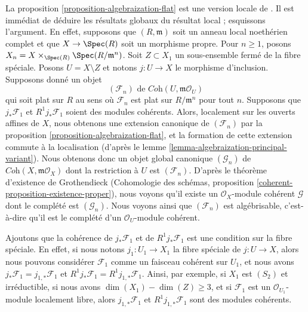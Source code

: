 \begin{remark}
\label{remark-interesting-case-quater}
La proposition \ref{proposition-algebraization-flat} est une version locale
de \cite[théorème 2.10 (i)]{Baranovsky}. Il est immédiat de déduire
les résultats globaux du résultat local ; esquissons l'argument.
En effet, supposons que $(R, \mathfrak m)$
soit un anneau local noethérien complet et que $X \to \Spec(R)$ soit un morphisme propre.
Pour $n \geq 1$, posons $X_n = X \times_{\Spec(R)} \Spec(R/\mathfrak m^n)$.
Soit $Z \subset X_1$ un sous-ensemble fermé de la fibre spéciale.
Posons $U = X \setminus Z$ et notons $j : U \to X$ le morphisme d'inclusion.
Supposons donné un objet
$$
(\mathcal{F}_n) \text{ de } \textit{Coh}(U, \mathfrak m\mathcal{O}_U)
$$
qui soit plat sur $R$ au sens où $\mathcal{F}_n$ est plat sur
$R/\mathfrak m^n$ pour tout $n$.
Supposons que $j_*\mathcal{F}_1$ et $R^1j_*\mathcal{F}_1$ soient des modules
cohérents. Alors, localement sur les ouverts affines de $X$, nous obtenons une extension canonique
de $(\mathcal{F}_n)$ par la
proposition \ref{proposition-algebraization-flat},
et la formation de cette extension commute à la localisation
(d'après le lemme \ref{lemma-algebraization-principal-variant}).
Nous obtenons donc un objet global canonique $(\mathcal{G}_n)$ de
$\textit{Coh}(X, \mathfrak m\mathcal{O}_X)$
dont la restriction à $U$ est $(\mathcal{F}_n)$.
D'après le théorème d'existence de Grothendieck
(Cohomologie des schémas, proposition
\ref{coherent-proposition-existence-proper}),
nous voyons qu'il existe un $\mathcal{O}_X$-module cohérent
$\mathcal{G}$ dont le complété est $(\mathcal{G}_n)$.
Nous voyons ainsi que $(\mathcal{F}_n)$ est algébrisable, c'est-à-dire
qu'il est le complété d'un $\mathcal{O}_U$-module cohérent.

\medskip\noindent
Ajoutons que la cohérence de $j_*\mathcal{F}_1$ et de $R^1j_*\mathcal{F}_1$
est une condition sur la fibre spéciale. En effet, si nous notons
$j_1 : U_1 \to X_1$ la fibre spéciale de $j : U \to X$, alors nous pouvons
considérer $\mathcal{F}_1$ comme un faisceau cohérent sur $U_1$, et nous avons
$j_*\mathcal{F}_1 = j_{1, *}\mathcal{F}_1$ et
$R^1j_*\mathcal{F}_1 = R^1j_{1, *}\mathcal{F}_1$.
Ainsi, par exemple, si $X_1$ est $(S_2)$ et irréductible, si nous avons
$\dim(X_1) - \dim(Z) \geq 3$, et si $\mathcal{F}_1$ est un
$\mathcal{O}_{U_1}$-module localement libre, alors $j_{1, *}\mathcal{F}_1$ et
$R^1j_{1, *}\mathcal{F}_1$ sont des modules cohérents.
\end{remark}








